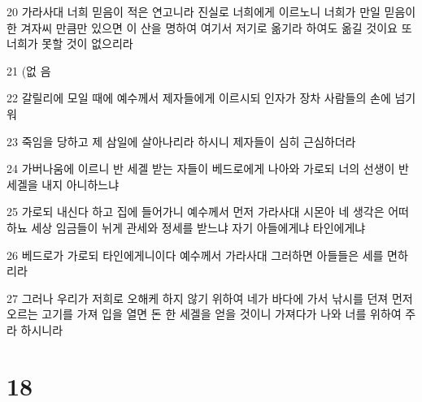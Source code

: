 \par 20 가라사대 너희 믿음이 적은 연고니라 진실로 너희에게 이르노니 너희가 만일 믿음이 한 겨자씨 만큼만 있으면 이 산을 명하여 여기서 저기로 옮기라 하여도 옮길 것이요 또 너희가 못할 것이 없으리라
\par 21 (없 음
\par 22 갈릴리에 모일 때에 예수께서 제자들에게 이르시되 인자가 장차 사람들의 손에 넘기워
\par 23 죽임을 당하고 제 삼일에 살아나리라 하시니 제자들이 심히 근심하더라
\par 24 가버나움에 이르니 반 세겔 받는 자들이 베드로에게 나아와 가로되 너의 선생이 반 세겔을 내지 아니하느냐
\par 25 가로되 내신다 하고 집에 들어가니 예수께서 먼저 가라사대 시몬아 네 생각은 어떠하뇨 세상 임금들이 뉘게 관세와 정세를 받느냐 자기 아들에게냐 타인에게냐
\par 26 베드로가 가로되 타인에게니이다 예수께서 가라사대 그러하면 아들들은 세를 면하리라
\par 27 그러나 우리가 저희로 오해케 하지 않기 위하여 네가 바다에 가서 낚시를 던져 먼저 오르는 고기를 가져 입을 열면 돈 한 세겔을 얻을 것이니 가져다가 나와 너를 위하여 주라 하시니라

\chapter{18}


